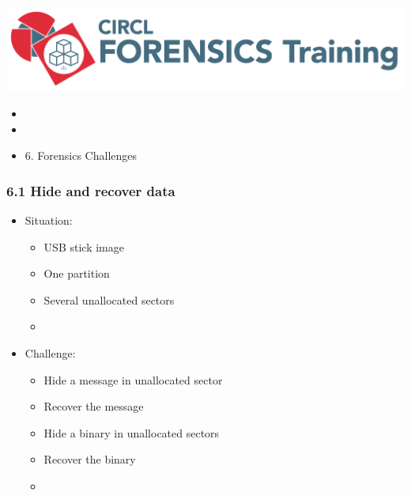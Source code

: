 %
%



\begin{frame}
    \includegraphics[scale=0.3]{images/logo-circl-Forensics.png}
    \begin{itemize}
        \item[]
        \item[]
        \item[] 6. Forensics Challenges
    \end{itemize}
\end{frame}


\begin{frame}[fragile]
  \frametitle{6.1 Hide and recover data}
  \begin{itemize}
    \item Situation:
    \begin{itemize}
      \item USB stick image
      \item One partition
      \item Several unallocated sectors
      \item[]
    \end{itemize}
    \item Challenge:
    \begin{itemize}
      \item Hide a message in unallocated sector
      \item Recover the message
      \item Hide a binary in unallocated sectors
      \item Recover the binary
      \item[]
    \end{itemize}
  \end{itemize}
\end{frame}


